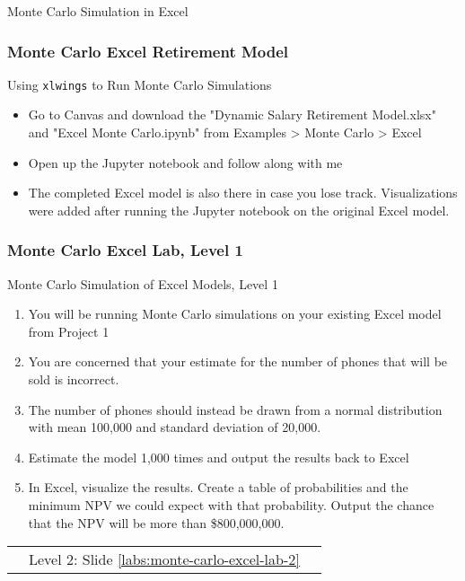 \documentclass[handout, 11pt]{beamer}
\begin{document}
\begin{section}[Excel MC]{Monte Carlo Simulation in Excel}
\begin{frame}
\begin{itemize}
\end{itemize}
\end{frame}
\begin{frame}
\frametitle{Monte Carlo Excel Retirement Model}
{
\begin{block}{Using \texttt{xlwings} to Run Monte Carlo Simulations}
\begin{itemize}
\item Go to Canvas and download the "Dynamic Salary Retirement Model.xlsx" and "Excel Monte Carlo.ipynb" from Examples > Monte Carlo > Excel
\item Open up the Jupyter notebook and follow along with me
\item The completed Excel model is also there in case you lose track. Visualizations were added after running the Jupyter notebook on the original Excel model.
\end{itemize}
\end{block}
}
\end{frame}
\begin{frame}
\frametitle{Monte Carlo Excel Lab, Level 1}
{
\begin{block}{Monte Carlo Simulation of Excel Models, Level 1}
\begin{enumerate}
\item You will be running Monte Carlo simulations on your existing Excel model from Project 1
\item You are concerned that your estimate for the number of phones that will be sold is incorrect. 
\item The number of phones should instead be drawn from a normal distribution with mean 100,000 and standard deviation of 20,000.
\item Estimate the model 1,000 times and output the results back to Excel
\item In Excel, visualize the results.  Create a table of probabilities and the minimum NPV we could expect with that probability. Output the chance that the NPV will be more than \$800,000,000.
\end{enumerate}
\vfill
\begin{tabular*}{\textwidth}{@{\extracolsep{\fill}}ccc}
\toprule
\hfill & Level 2: Slide \textcolor{blue}{\underline{\ref{labs:monte-carlo-excel-lab-2}}} & \hfill\\

\end{tabular*}
\end{block}
}
\label{labs:monte-carlo-excel-lab-1}
\end{frame}
\end{section}
\end{document}
